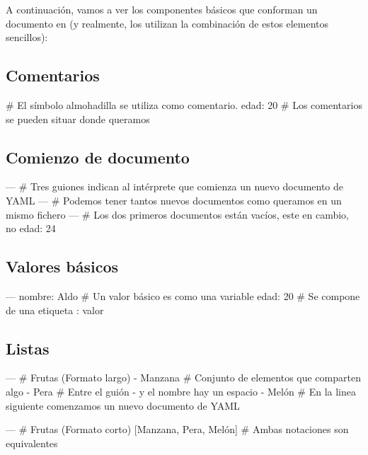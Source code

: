A continuación, vamos a ver los componentes básicos que conforman un documento en \yaml{} (y realmente, los \profiles{} utilizan la combinación de estos elementos sencillos):

\subsection{Comentarios}

\begin{pyglist}[language=yaml]
  # El símbolo almohadilla se utiliza como comentario.
  edad: 20 # Los comentarios se pueden situar donde queramos
\end{pyglist}

\subsection{Comienzo de documento}

\begin{pyglist}[language=yaml]
  --- # Tres guiones indican al intérprete que comienza un nuevo documento de YAML
  --- # Podemos tener tantos nuevos documentos como queramos en un mismo fichero
  --- # Los dos primeros documentos están vacíos, este en cambio, no
  edad: 24
\end{pyglist}

\subsection{Valores básicos}

\begin{pyglist}[language=yaml]
  ---
  nombre: Aldo # Un valor básico es como una variable
  edad: 20 # Se compone de una etiqueta : valor
\end{pyglist}

\subsection{Listas}

\begin{pyglist}[language=yaml]
  --- # Frutas (Formato largo)
  - Manzana # Conjunto de elementos que comparten algo
  - Pera # Entre el guión - y el nombre hay un espacio
  - Melón # En la linea siguiente comenzamos un nuevo documento de YAML
  
  --- # Frutas (Formato corto)
  [Manzana, Pera, Melón]  # Ambas notaciones son equivalentes
\end{pyglist}

